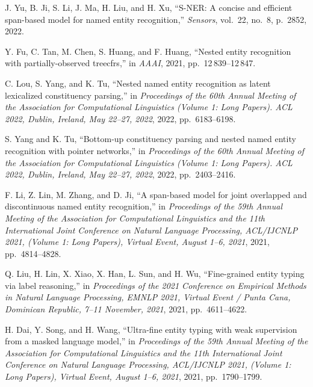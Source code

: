 \begin{enumerate}[leftmargin=2em,label={[\arabic*]}]
\item J. Yu, B. Ji, S. Li, J. Ma, H. Liu, and H. Xu, ``S-NER: A concise and efficient span-based model for named entity recognition,'' \textit{Sensors}, vol.~22, no.~8, p.~2852, 2022.

\item Y. Fu, C. Tan, M. Chen, S. Huang, and F. Huang, ``Nested entity recognition with partially-observed treecfrs,'' in \textit{AAAI}, 2021, pp.~12\,839--12\,847.

\item C. Lou, S. Yang, and K. Tu, ``Nested named entity recognition as latent lexicalized constituency parsing,'' in \textit{Proceedings of the 60th Annual Meeting of the Association for Computational Linguistics (Volume 1: Long Papers). ACL 2022, Dublin, Ireland, May 22--27, 2022}, 2022, pp.~6183--6198.

\item S. Yang and K. Tu, ``Bottom-up constituency parsing and nested named entity recognition with pointer networks,'' in \textit{Proceedings of the 60th Annual Meeting of the Association for Computational Linguistics (Volume 1: Long Papers). ACL 2022, Dublin, Ireland, May 22--27, 2022}, 2022, pp.~2403--2416.

\item F. Li, Z. Lin, M. Zhang, and D. Ji, ``A span-based model for joint overlapped and discontinuous named entity recognition,'' in \textit{Proceedings of the 59th Annual Meeting of the Association for Computational Linguistics and the 11th International Joint Conference on Natural Language Processing, ACL/IJCNLP 2021, (Volume 1: Long Papers), Virtual Event, August 1--6, 2021}, 2021, pp.~4814--4828.

\item Q. Liu, H. Lin, X. Xiao, X. Han, L. Sun, and H. Wu, ``Fine-grained entity typing via label reasoning,'' in \textit{Proceedings of the 2021 Conference on Empirical Methods in Natural Language Processing, EMNLP 2021, Virtual Event / Punta Cana, Dominican Republic, 7--11 November, 2021}, 2021, pp.~4611--4622.

\item H. Dai, Y. Song, and H. Wang, ``Ultra-fine entity typing with weak supervision from a masked language model,'' in \textit{Proceedings of the 59th Annual Meeting of the Association for Computational Linguistics and the 11th International Joint Conference on Natural Language Processing, ACL/IJCNLP 2021, (Volume 1: Long Papers), Virtual Event, August 1--6, 2021}, 2021, pp.~1790--1799.


\end{enumerate}
